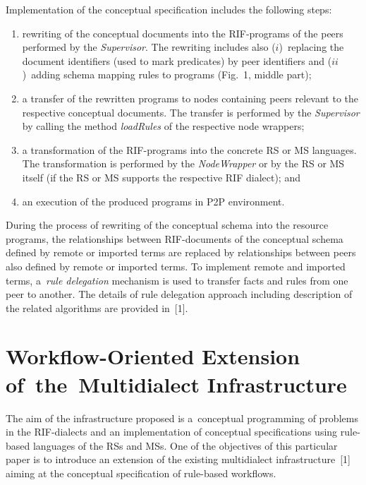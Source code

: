 \begin{multicols}{2}
  Implementation of the conceptual specification includes the following steps:
  \begin{enumerate}[(1)]
\item rewriting of the conceptual documents into the RIF-programs of the peers
performed by the \textit{Supervisor}. The rewriting includes also ($i$)~replacing the
document identifiers (used to mark predicates) by peer identifiers and ($ii$)~adding
schema mapping rules to programs (Fig.~1, middle part); %
\item a transfer of the rewritten programs to nodes containing peers relevant to the
respective conceptual documents. The transfer is performed by the \textit{Supervisor}
by calling the method \textit{loadRules} of the respective node wrappers; %
\item a transformation of the RIF-programs into the concrete RS or MS languages.
The transformation is performed by the \textit{NodeWrapper} or by the RS or MS
itself (if the RS or MS supports the respective RIF dialect); and %
\item an execution of the produced programs in P2P environment.
\end{enumerate}

  During the process of rewriting of the conceptual schema into the resource
programs, the relationships between RIF-documents of the conceptual schema defined
by remote or imported terms are replaced by relationships between peers also defined
by remote or imported terms. To implement remote and imported terms, a~\textit{rule
delegation} mechanism is used to transfer facts and rules from one peer to another.
The details of rule delegation approach including description of the related algorithms
are provided in~[1].

\vspace*{-7pt}

\section{Workflow-Oriented Extension of~the~Multidialect
Infrastructure}

\vspace*{-2pt}

  \noindent
  The aim of the infrastructure proposed is a~conceptual programming of problems in
the RIF-dialects and an implementation of conceptual specifications using rule-based
languages of the RSs and MSs. One of the objectives of this particular paper is to
introduce an extension of the existing multidialect infrastructure~[1] aiming at the
conceptual specification of rule-based workflows.


\end{multicols}

